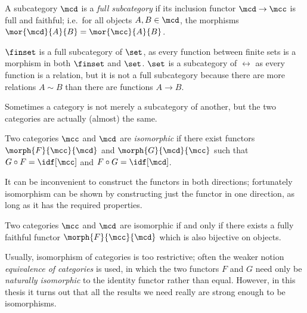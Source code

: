 \begin{definition}
    A subcategory \(\mcd\) is a \emph{full subcategory} if its inclusion functor
    \(\mcd \to \mcc\) is full and faithful; i.e.\ for all objects
    \(A, B \in \mcd\), the morphisms \(\mor{\mcd}{A}{B} = \mor{\mcc}{A}{B}\).
\end{definition}

\begin{example}
    \(\finset\) is a full subcategory of \(\set\), as every function between
    finite sets is a morphism in both \(\finset\) and \(\set\).
    \(\set\) is a subcategory of \(\rel\) as every function is a relation, but
    it is not a full subcategory because there are more relations \(A \sim B\)
    than there are functions \(A \to B\).
\end{example}

Sometimes a category is not merely a subcategory of another, but the two
categories are actually (almost) the same.

\begin{definition}
    Two categories \(\mcc\) and \(\mcd\) are \emph{isomorphic} if there exist
    functors \(\morph{F}{\mcc}{\mcd}\) and \(\morph{G}{\mcd}{\mcc}\) such that
    \(G \circ F = \idf[\mcc]\) and \(F \circ G = \idf[\mcd]\).
\end{definition}

It can be inconvenient to construct the functors in both directions; fortunately
isomorphism can be shown by constructing just the functor in one direction, as
long as it has the required properties.

\begin{lemma}
    Two categories \(\mcc\) and \(\mcd\) are isomorphic if and only if there
    exists a fully faithful functor \(\morph{F}{\mcc}{\mcd}\) which is also
    bijective on objects.
\end{lemma}

\begin{remark}
    Usually, isomorphism of categories is too restrictive; often the weaker
    notion \emph{equivalence of categories} is used, in which the two functors
    \(F\) and \(G\) need only be \emph{naturally isomorphic} to the identity
    functor rather than equal.
    However, in this thesis it turns out that all the results we need really are
    strong enough to be isomorphisms.
\end{remark}


